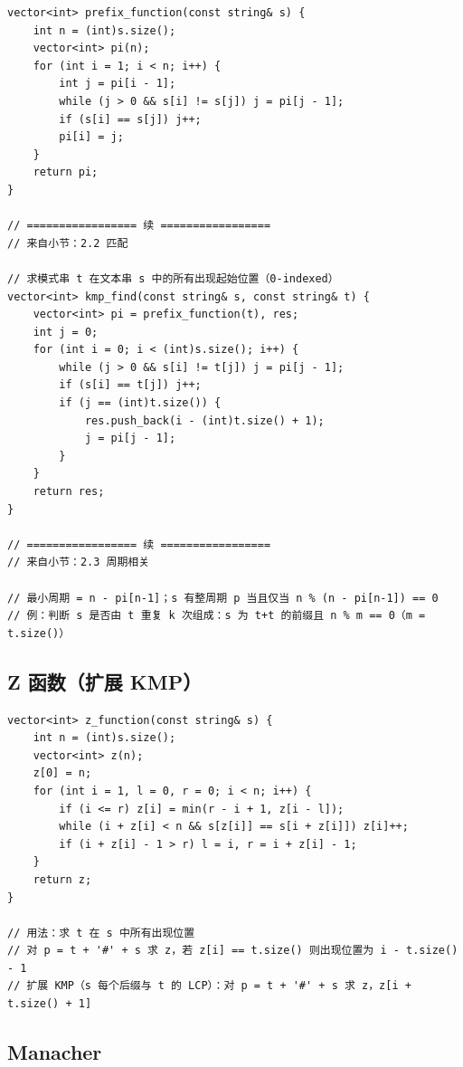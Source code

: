 \begin{lstlisting}
vector<int> prefix_function(const string& s) {
    int n = (int)s.size();
    vector<int> pi(n);
    for (int i = 1; i < n; i++) {
        int j = pi[i - 1];
        while (j > 0 && s[i] != s[j]) j = pi[j - 1];
        if (s[i] == s[j]) j++;
        pi[i] = j;
    }
    return pi;
}

// ================= 续 =================
// 来自小节：2.2 匹配

// 求模式串 t 在文本串 s 中的所有出现起始位置（0-indexed）
vector<int> kmp_find(const string& s, const string& t) {
    vector<int> pi = prefix_function(t), res;
    int j = 0;
    for (int i = 0; i < (int)s.size(); i++) {
        while (j > 0 && s[i] != t[j]) j = pi[j - 1];
        if (s[i] == t[j]) j++;
        if (j == (int)t.size()) {
            res.push_back(i - (int)t.size() + 1);
            j = pi[j - 1];
        }
    }
    return res;
}

// ================= 续 =================
// 来自小节：2.3 周期相关

// 最小周期 = n - pi[n-1]；s 有整周期 p 当且仅当 n % (n - pi[n-1]) == 0
// 例：判断 s 是否由 t 重复 k 次组成：s 为 t+t 的前缀且 n % m == 0（m = t.size()）
\end{lstlisting}

\subsection{Z 函数（扩展 KMP）}

\begin{lstlisting}
vector<int> z_function(const string& s) {
    int n = (int)s.size();
    vector<int> z(n);
    z[0] = n;
    for (int i = 1, l = 0, r = 0; i < n; i++) {
        if (i <= r) z[i] = min(r - i + 1, z[i - l]);
        while (i + z[i] < n && s[z[i]] == s[i + z[i]]) z[i]++;
        if (i + z[i] - 1 > r) l = i, r = i + z[i] - 1;
    }
    return z;
}

// 用法：求 t 在 s 中所有出现位置
// 对 p = t + '#' + s 求 z，若 z[i] == t.size() 则出现位置为 i - t.size() - 1
// 扩展 KMP（s 每个后缀与 t 的 LCP）：对 p = t + '#' + s 求 z，z[i + t.size() + 1]
\end{lstlisting}

\subsection{Manacher}

